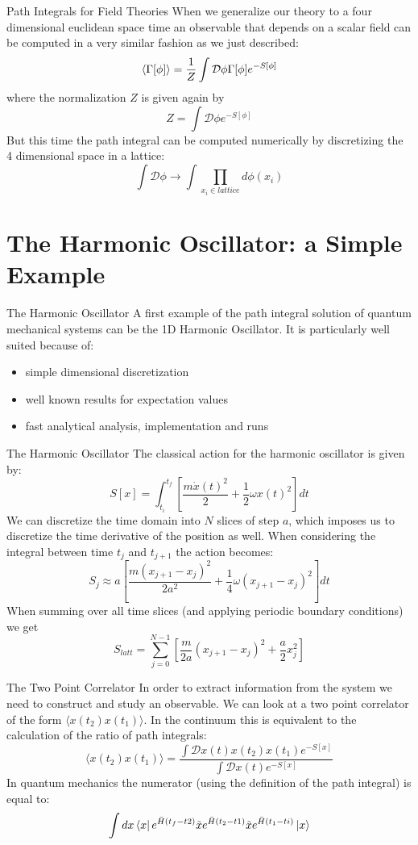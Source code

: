 \documentclass[10pt]{beamer}
\newcommand{\D}{\mathcal{D}}
\begin{document}
\begin{frame}{Path Integrals for Field Theories}
When we generalize our theory to a four dimensional euclidean space time an observable that depends on a scalar field can be computed in a very similar fashion as we just described:
\[
	\braket{\Gamma[\phi]} = \frac{1}{Z} \int \D \phi \Gamma[\phi] e^{-S[\phi]}
\]
where the normalization $Z$ is given again by 
\[
	Z = \int \D \phi e^{-S[\phi]}
\]
But this time the path integral can be computed numerically by discretizing the 4 dimensional space in a lattice:
\[
	 \int \D \phi \rightarrow \int \prod_{x_i \in lattice} d\phi(x_i)
\] 
\end{frame}



\section{The Harmonic Oscillator: a Simple Example}
\begin{frame}{The Harmonic Oscillator}
A first example of the path integral solution of quantum mechanical systems can be the 1D Harmonic Oscillator. It is particularly well suited because of:
\begin{itemize}
\item simple dimensional discretization
\item well known results for expectation values
\item fast analytical analysis, implementation and runs 
\end{itemize}
\end{frame}

\begin{frame}{The Harmonic Oscillator}
The classical action for the harmonic oscillator is given by:
\[
	S[x] = \int_{t_i}^{t_f} \left[ \frac{m\dot{x}(t)^2}{2} + \frac{1}{2}\omega x(t)^2\right] dt
\]
We can discretize the time domain into $N$ slices of step $a$, which imposes us to discretize the time derivative of the position as well. When considering the integral between time $t_j$ and $t_{j+1}$ the action becomes:
\[
	S_{j} \approx a\left[ \frac{m(x_{j+1}-x_j)^2}{2a^2} + \frac{1}{4}\omega (x_{j+1} - x_j)^2 \right] dt 
\]
When summing over all time slices (and applying periodic boundary conditions) we get
\[	
	S_{latt} = \sum_{j = 0}^{N-1} \left[ \frac{m}{2a}(x_{j+1}-x_j)^2 + \frac{a}{2} x_j^2 \right]
\]
\end{frame}

\begin{frame}{The Two Point Correlator}
In order to extract information from the system we need to construct and study an observable. We can look at a two point correlator of the form $\langle x(t_2)x(t_1) \rangle$.  
In the continuum this is equivalent to the calculation of the ratio of path integrals:
\[
	\langle x(t_2)x(t_1) \rangle = \frac{\int \D x(t) x(t_2) x(t_1) e^{-S[x]}}{\int \D x(t) e^{-S[x]}}
\]
In quantum mechanics the numerator (using the definition of the path integral) is equal to:
\[	
	\int dx \bra{x} e^{\bar{H}(t_f-t2)} \tilde{x} e^{\bar{H}(t_2-t1)} \tilde{x} e^{\bar{H}(t_1-ti)} \ket{x}
\]
\end{frame}
\end{document}
